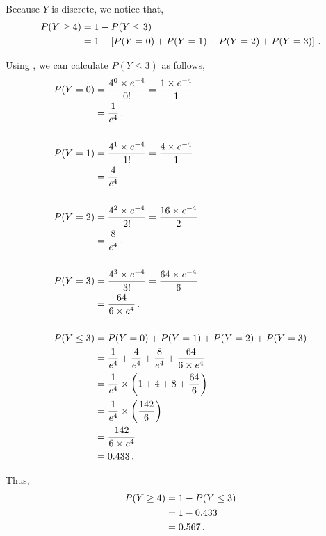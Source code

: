 \begin{subquestions}
\begin{subsubquestions}
Because $Y$ is discrete, we notice that,
\begin{align}
	P(Y \geq 4) & = 1 - P(Y \leq 3) \nonumber \\
	            & = 1 - \left[P(Y=0)+P(Y=1)+P(Y=2)+P(Y=3) \right] \,.
\end{align}

Using , we can calculate $P(Y \leq 3)$ as follows,
\begin{align}
	P(Y=0) & = \frac{4^0 \times e^{-4}}{0!} 
	         = \frac{1 \times e^{-4}}{1} \nonumber \\
	       & = \frac{1}{e^4} \,. \\	\nonumber \\
	P(Y=1) & = \frac{4^1 \times e^{-4}}{1!} 
	         = \frac{4 \times e^{-4}}{1} \nonumber \\
	       & = \frac{4}{e^4} \,. \\	\nonumber \\       
	P(Y=2) & = \frac{4^2 \times e^{-4}}{2!} 
		     = \frac{16 \times e^{-4}}{2} \nonumber \\
           & = \frac{8}{e^4} \,. \\ \nonumber \\            
	P(Y=3) & = \frac{4^3 \times e^{-4}}{3!} 
             = \frac{64 \times e^{-4}}{6} \nonumber \\
           & = \frac{64}{6 \times e^4} \,. \\ \nonumber \\         
    P(Y \leq 3) & = P(Y=0)+P(Y=1)+P(Y=2)+P(Y=3) \nonumber \\
                & = \frac{1}{e^4} + \frac{4}{e^4} + \frac{8}{e^4} + \frac{64}{6 \times e^4} \nonumber \\
                & = \frac{1}{e^4} \times \left(1+4+8+\frac{64}{6} \right) \nonumber \\
                & = \frac{1}{e^4} \times \left(\frac{142}{6} \right) \nonumber \\
                & = \frac{142}{6 \times e^4} \nonumber \\
                & = 0.433 \,.
\end{align}

Thus,
\begin{align}
	P(Y \geq 4) & = 1 - P(Y \leq 3) \nonumber \\
	            & = 1 - 0.433 \nonumber \\
	            & = 0.567 \,.
\end{align}



\end{subsubquestions}
\end{subquestions}
